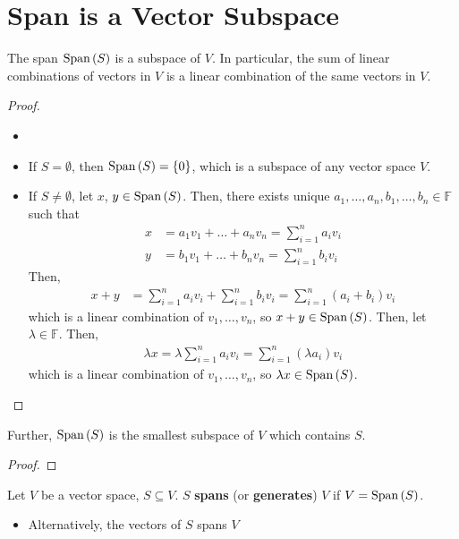 \documentclass[letterpaper,12pt]{article}
\begin{document}
\section*{Span is a Vector Subspace}
\begin{theorem}
The span $\text{Span}\left(S \right)$ is a subspace of $V$. In particular, the sum of linear combinations of vectors in $V$ is a linear combination of the same vectors in $V$.
\end{theorem}
\begin{proof}
\begin{itemize}
    \item[]
    \item If $S = \emptyset$, then $\text{Span}\left(S \right) = \left\{ 0 \right\}$, which is a subspace of any vector space $V$.
    \item If $S \neq \emptyset$, let $x$, $y \in \text{Span}\left(S \right)$. Then, there exists unique $a_1, \dots, a_n, b_1, \dots, b_n \in \mathbb{F}$ such that
    \begin{align*}
        x & = a_1 v_1 + \dots + a_n v_n = \sum_{i=1}^n a_i v_i \\
        y & = b_1 v_1 + \dots + b_n v_n = \sum_{i=1}^n b_i v_i
    \end{align*}
    Then,
    \begin{align*}
        x + y & = \sum_{i=1}^n a_i v_i + \sum_{i=1}^n b_i v_i = \sum_{i=1}^n (a_i + b_i) v_i
    \end{align*}
    which is a linear combination of $v_1, \dots, v_n$, so $x + y \in \text{Span}\left(S \right)$. Then, let $\lambda \in \mathbb{F}$. Then,
    \begin{align*}
        \lambda x = \lambda \sum_{i=1}^n a_i v_i = \sum_{i=1}^n (\lambda a_i) v_i
    \end{align*}
    which is a linear combination of $v_1, \dots, v_n$, so $\lambda x \in \text{Span}\left(S \right)$.
\end{itemize}
\end{proof}

\begin{theorem}
Further, $\text{Span}\left(S \right)$ is the smallest subspace of $V$ which contains $S$.
\end{theorem}
\begin{proof}

\end{proof}

\begin{definition}
Let $V$ be a vector space, $S \subseteq V$. $S$ \textbf{spans} (or \textbf{generates}) $V$ if $V = \text{Span}\left(S \right)$.
\begin{itemize}
    \item Alternatively, the vectors of $S$ spans $V$
\end{itemize}
\end{definition}
\end{document}
